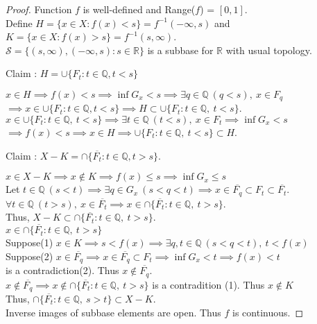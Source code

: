 \begin{proof}
	Function $f$ is well-defined and Range($f$) = $[0,1]$.\\
	Define $H = \{ x \in X : f(x) < s \} = f^{-1}(-\infty,s)$ and\\
	$K = \{ x \in X : f(x) > s \} = f^{-1}(s,\infty)$.\\
	$\mathcal{S} = \{ (s,\infty), (-\infty,s) : s \in \mathbb{R} \}$ is a subbase for $\mathbb{R}$ with usual topology.\\
	\begin{important}
	Claim : $H = \cup\{F_t : t \in \mathbb{Q}, t < s\}$\\
	\end{important}
	$x \in H \implies f(x) < s \implies \inf G_x < s \implies \exists q \in \mathbb{Q}\ (q < s),\ x \in F_q$\\
	$\implies x \in \cup\{F_t : t \in \mathbb{Q}, t < s \} \implies H \subset \cup\{ F_t : t \in \mathbb{Q},\ t < s \}$.\\
	$x \in \cup\{F_t : t \in \mathbb{Q},\ t < s \} \implies \exists t \in \mathbb{Q}\ (t < s),\ x \in F_t \implies \inf G_x < s$\\
	$\implies f(x) < s \implies x \in H \implies \cup\{F_t : t \in \mathbb{Q},\ t < s \} \subset H$.\\
	\begin{important}
	Claim : $X-K = \cap\{ \overline{F_t} : t \in \mathbb{Q}, t > s \}$.\\
	\end{important}
	$x \in X-K \implies x \not\in K \implies f(x) \le s \implies \inf G_x \le s$\\
	Let $t \in \mathbb{Q}\ (s < t) \implies \exists q \in G_x\ (s < q < t) \implies x \in \overline{F_q} \subset F_t \subset \overline{F_t}$.\\
	$\forall t \in \mathbb{Q}\ (t > s),\ x \in \overline{F_t} \implies x \in \cap\{\overline{F_t} : t \in \mathbb{Q},\ t > s \}$.\\
	Thus, $ X-K \subset \cap\{\overline{F_t} : t \in \mathbb{Q},\ t > s \}$.\\
	$ x \in \cap\{\overline{F_t} : t \in \mathbb{Q},\ t > s \}$\\
	Suppose(1) $x \in K \implies s < f(x) \implies \exists q,t \in \mathbb{Q}\ (s < q < t),\ t < f(x)$\\
	Suppose(2) $x \in \overline{F_q} \implies x \in \overline{F_q} \subset F_t \implies \inf G_x < t \implies f(x) < t$\\
	is a contradiction(2).
	Thus $x \not\in \overline{F_q}$.\\
	$x \not\in \overline{F_q} \implies x \not\in \cap\{\overline{F_t} : t \in \mathbb{Q},\ t > s\}$ is a contradition (1).
	Thus $x \not\in K$\\
	Thus, $\cap\{\overline{F_t} : t \in \mathbb{Q},\ s > t \} \subset X-K$.\\
	Inverse images of subbase elements are open.
	Thus $f$ is continuous.
\end{proof}

